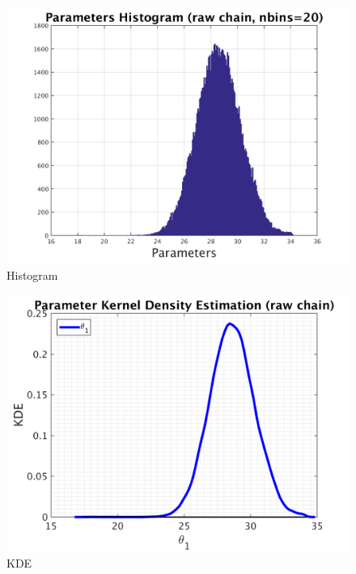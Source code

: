 \begin{figure}[H]
  
  \centering
   \includegraphics[scale=0.75]{53_results/output_100000/simple_ip_hist_raw}
   \caption{Histogram}
\end{figure}



\begin{figure}[H]
  
  \centering
   \includegraphics[scale=0.75]{53_results/output_100000/simple_ip_kde_raw}
   \caption{ KDE }
\end{figure}

